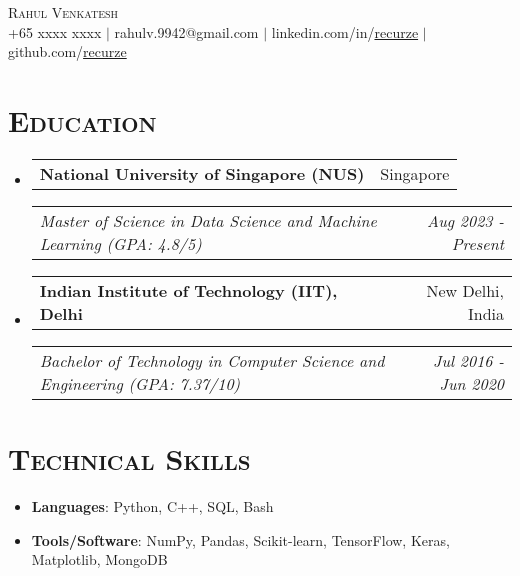 \documentclass[11pt]{article}
\makeatletter
\newcommand{\headerrow}[2]
{\begin{tabular*}{\linewidth}{l@{\extracolsep{\fill}}r}
    #1 &
    #2 \\
\end{tabular*}}
\makeatother
\begin{document}
\thispagestyle{empty}

\begin{center}
    {\huge \textsc{Rahul Venkatesh}} \\[2pt]
    +65 xxxx xxxx
    $\mid$
    rahulv.9942@gmail.com
    $\mid$
    linkedin.com/in/\href{https://www.linkedin.com/in/recurze}{recurze}
    $\mid$
    github.com/\href{https://github.com/recurze}{recurze}
\end{center}

\section*{\textsc{\textbf{Education}}}
\begin{itemize}[leftmargin=0em]

\item[]
    \headerrow {\textbf{National University of Singapore (NUS)}}{Singapore}
    \headerrow {\emph{Master of Science in Data Science and Machine Learning (GPA: 4.8/5)}}{\emph{Aug 2023 - Present}}

\item[]
    \headerrow {\textbf{Indian Institute of Technology (IIT), Delhi}}{New Delhi, India}
    \headerrow {\emph{Bachelor of Technology in Computer Science and Engineering (GPA: 7.37/10)}}{\emph{Jul 2016 - Jun 2020}}

\end{itemize}

\section*{\textsc{\textbf{Technical Skills}}}
\begin{itemize}[itemsep=0em, leftmargin=0.7em]
\item[]
    \textbf{Languages}: Python, C++, SQL, Bash
\item[]
    \textbf{Tools/Software}: NumPy, Pandas, Scikit-learn, TensorFlow, Keras, Matplotlib, MongoDB
\end{itemize}
\end{document}
